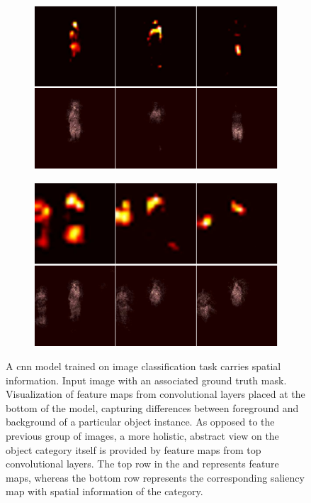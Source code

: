 \begin{figure}[t]
\begin{subfigure}[b]{0.13\textwidth}
        \caption[]{}
    \end{subfigure}
    \hfill
    \begin{subfigure}[b]{0.39\textwidth}
        \centering
        \includegraphics[width=\textwidth]{figures/theoretical_foundations/fully_cnn_tracking_feature_maps_2.pdf}
        \caption[]{}
    \end{subfigure}
    \hfill
    \begin{subfigure}[b]{0.39\textwidth}
        \centering
        \includegraphics[width=\textwidth]{figures/theoretical_foundations/fully_cnn_tracking_feature_maps_3.pdf}
        \caption[]{}
    \end{subfigure}
    \caption[Fully convolutional tracking]{A \gls{cnn} model trained on image classification task carries spatial information.  Input image with an associated ground truth mask.  Visualization of feature maps from convolutional layers placed at the bottom of the model, capturing differences between foreground and background of a particular object instance.  As opposed to the previous group of images, a more holistic, abstract view on the object category itself is provided by feature maps from top convolutional layers. The top row in the  and  represents feature maps, whereas the bottom row represents the corresponding saliency map with spatial information of the category. }
    \label{fig:FullyCNNTrackingFeatureMaps}
\end{figure}

